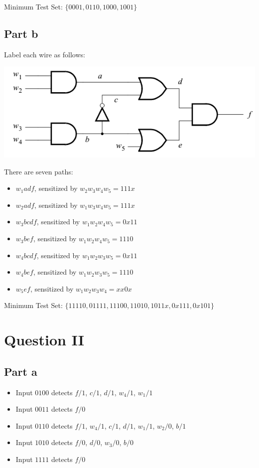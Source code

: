 \documentclass[12pt, a4paper]{article}
\begin{document}
	Minimum Test Set: $\{0001, 0110, 1000, 1001\}$
	
	\subsection*{Part b}
	Label each wire as follows:
	
	\begin{center}
		\includegraphics[scale=0.5]{Q1b.png}
	\end{center}
	
	There are seven paths:
	\begin{itemize}
		\item $w_1adf$, sensitized by $w_2w_3w_4w_5 = 111x$
		\item $w_2adf$, sensitized by $w_1w_3w_4w_5 = 111x$
		\item $w_3bcdf$, sensitized by $w_1w_2w_4w_5 = 0x11$
		\item $w_3bef$, sensitized by $w_1w_2w_4w_5 = 1110$
		\item $w_4bcdf$, sensitized by $w_1w_2w_3w_5 = 0x11$
		\item $w_4bef$, sensitized by $w_1w_2w_3w_5 = 1110$
		\item $w_5ef$, sensitized by $w_1w_2w_3w_4 = xx0x$
	\end{itemize}
	
	Minimum Test Set: $\{11110,01111,11100,11010,1011x,0x111,0x101\}$
	
	\section*{Question II}
	\subsection*{Part a}
	\begin{itemize}
		\item Input $0100$ detects $f/1$, $c/1$, $d/1$, $w_4/1$, $w_1/1$
		\item Input $0011$ detects $f/0$
		\item Input $0110$ detects $f/1$, $w_4/1$, $c/1$, $d/1$, $w_1/1$, $w_2/0$, $b/1$
		\item Input $1010$ detects $f/0$, $d/0$, $w_3/0$, $b/0$
		\item Input $1111$ detects $f/0$
	\end{itemize}
	
\end{document}
